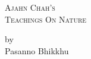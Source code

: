 \documentclass[11pt,a4paper,oneside,showtrims]{memoir}
\newlength\onePageHeight
\begin{document}

\raggedleft
\color{white}

{\scshape\LARGE
Ajahn Chah's\\[2mm]
\huge
Teachings On Nature}

\vfill

{\authorFont\Large
by\\
Pasanno Bhikkhu}
\end{document}
